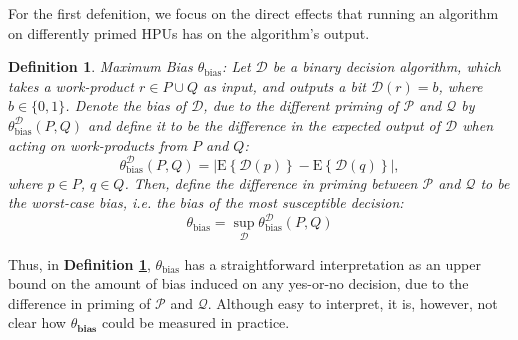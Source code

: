 \documentclass[12pt]{article}
\newtheorem{mydef}{Definition}
\begin{document}
For the first defenition, we focus on the direct effects that running an 
algorithm on differently primed HPUs has on the algorithm's output.

\begin{mydef}
	\label{def:bias}
	{\upshape Maximum Bias $\theta_\mathrm{bias}$:}
	Let $\mathcal{D}$ be a binary decision algorithm, which takes a 
	work-product
	$r \in P \cup Q$ as input, and outputs a bit $\mathcal{D}(r)=b$, where 
	$b \in \{0,1\}$. Denote the \emph{bias} of $\mathcal{D}$, due to the
	different priming of $\mathcal{P}$ and $\mathcal{Q}$ by
	$\theta^\mathcal{D}_\mathrm{bias}(P,Q)$ and define it to be the difference 
	in the expected output of $\mathcal{D}$ when acting on work-products from 
	$P$ and $Q$:
	$$
	\theta^\mathcal{D}_\mathrm{bias}(P,Q) = 
		\left| 
			\mathrm{E}\left\{ \mathcal{D}(p) \right\} 
			- \mathrm{E}\left\{ \mathcal{D}(q) \right\} 
		\right|,
	$$
	where $p \in P$, $q \in Q$.  Then, define the difference in priming 
	between $\mathcal{P}$ and $\mathcal{Q}$ to be the worst-case bias, i.e. 
	the bias of the most susceptible decision:
	$$
	\theta_\mathrm{bias} = 
		\sup_\mathcal{D} \theta^\mathcal{D}_\mathrm{bias}(P,Q)
	$$
\end{mydef}
Thus, in \textbf{Definition \ref{def:bias}}, $\theta_\mathrm{bias}$ has a 
straightforward interpretation as an upper bound on the amount of bias induced 
on any yes-or-no decision, due to the difference in priming of 
$\mathcal{P}$ and $\mathcal{Q}$.  Although easy to interpret, it is, however, 
not clear how $\theta_\mathbf{bias}$ could be measured in practice.
\end{document}
